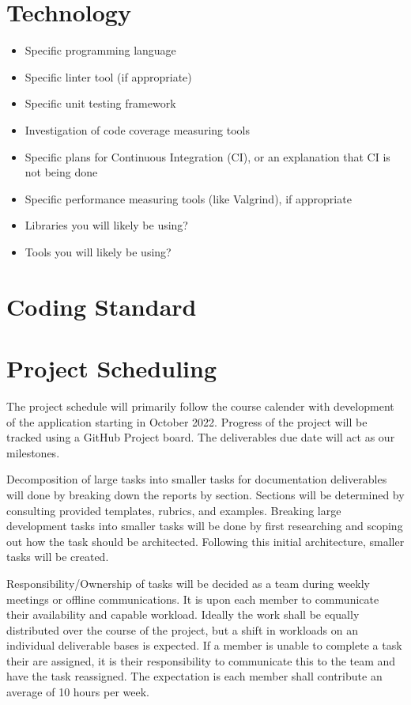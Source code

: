 \documentclass{article}
\begin{document}
\section{Technology}

\begin{itemize}
\item Specific programming language
\item Specific linter tool (if appropriate)
\item Specific unit testing framework
\item Investigation of code coverage measuring tools
\item Specific plans for Continuous Integration (CI), or an explanation that CI
  is not being done
\item Specific performance measuring tools (like Valgrind), if
  appropriate
\item Libraries you will likely be using?
\item Tools you will likely be using?
\end{itemize}

\section{Coding Standard}

\section{Project Scheduling}


The project schedule will primarily follow the course calender with development of the application
starting in October 2022. Progress of the project will be tracked using a GitHub Project board. The
deliverables due date will act as our milestones.

Decomposition of large tasks into smaller tasks for documentation deliverables will done by breaking
down the reports by section. Sections will be determined by consulting provided templates, rubrics,
and examples. Breaking large development tasks into smaller tasks will be done by first researching
and scoping out how the task should be architected. Following this initial architecture, smaller
tasks will be created.

Responsibility/Ownership of tasks will be decided as a team during weekly meetings or offline
communications. It is upon each member to communicate their availability and capable workload.
Ideally the work shall be equally distributed over the course of the project, but a shift in
workloads on an individual deliverable bases is expected. If a member is unable to complete a task
their are assigned, it is their responsibility to communicate this to the team and have the task
reassigned. The expectation is each member shall contribute an average of 10 hours per week.
\end{document}
